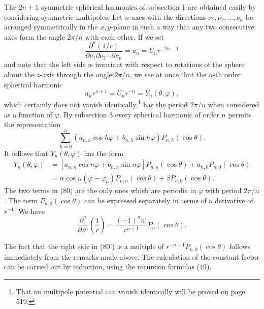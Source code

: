 The $2n+1$ symmetric spherical harmonics of subsection 1 are obtained easily by considering symmetric multipoles. Let $n$ axes with the directions $\nu_1,\nu_2,\ldots,\nu_n$ be arranged symmetrically in the $x,y$-plane in such a way that any two consecutive axes form the angle $2\pi/n$ with each other. If we set
\begin{equation}\tag{79}
\frac{\partial^n(1/r)}{\partial\nu_1\partial\nu_2\cdots\partial\nu_n}
=u_n=U_nr^{-2n-1}
\end{equation}
and note that the left side is invariant with respect to rotations of the sphere about the $z$-axis through the angle $2\pi/n$, we see at once that the $n$-th order spherical harmonic
\[
u_nr^{n+1}=U_nr^{-n}=Y_n(\theta,\varphi),
\]
which certainly does not vanish identically,\footnote{That no multipole potential can vanish identically will be proved on page 519.} has the period $2\pi/n$ when considered as a function of $\varphi$. By subsection 3 every spherical harmonic of order $n$ permits the representation
\[
\sum_{h=0}^{n}(a_{n,h}\cos h\varphi+b_{n,h}\sin h\varphi)P_{n,h}(\cos\theta).
\]
It follows that $Y_n(\theta,\varphi)$ has the form
\begin{equation}\tag{80}
\begin{aligned}
Y_n(\theta,\varphi)
&=[a_{n,n}\cos n\varphi+b_{n,n}\sin n\varphi]P_{n,n}(\cos\theta)
+a_{n,0}P_{n,0}(\cos\theta)\\
&=\alpha\cos n(\varphi-\varphi_0)P_{n,n}(\cos\theta)+\beta P_{n,0}(\cos\theta).
\end{aligned}
\end{equation}
The two terms in (80) are the only ones which are periodic in $\varphi$ with period $2\pi/n$. The term $P_{n,0}(\cos\theta)$ can be expressed separately in terms of a derivative of $r^{-1}$. We have
\begin{equation}\tag{80'}
\frac{\partial^n}{\partial z^n}\left(\frac1r\right)
=\frac{(-1)^n n!}{r^{n+1}}P_n(\cos\theta).
\end{equation}

The fact that the right side in (80') is a multiple of $r^{-n-1}P_{n,0}(\cos\theta)$ follows immediately from the remarks made above. The calculation of the constant factor can be carried out by induction, using the recursion formulas (49).


